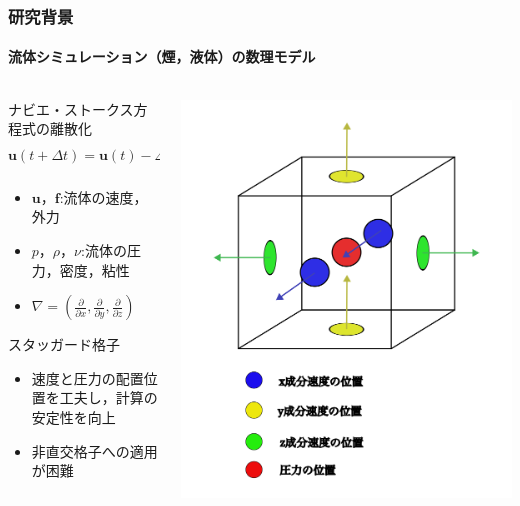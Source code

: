 \documentclass[aspectratio=169,dvipdfmx,hyperref={bookmarks=true}]{beamer}
\begin{document}
  \begin{frame}
  \frametitle{研究背景}
  \framesubtitle{流体シミュレーション（煙，液体）の数理モデル}

\begin{columns}[T]
	\begin{column}{0.6\linewidth}
	    \begin{block}{ナビエ・ストークス方程式の離散化}
    	\[
	\bm{u}(t + \varDelta t)  =\bm{u}(t) -\varDelta t( (\bm{u} \boldsymbol{\cdot}\nabla) \bm{u} - \frac{1}{\rho}\nabla p + \nu\nabla^2\bm{u} + \bm{f})
	\]
	\vspace{-10pt}
	\begin{itemize}
	\item $\bm{u}$，$\bm{f}$:流体の速度，外力
	\item $p$，$\rho$，$\nu$:流体の圧力，密度，粘性
	\item $\nabla = ( \frac{\partial}{\partial x}, \frac{\partial}{\partial y}, \frac{\partial}{\partial z})$
\end{itemize}
\end{block}
	\begin{block}{スタッガード格子}
		\begin{itemize}
		\item 速度と圧力の配置位置を工夫し，計算の安定性を向上
		\item 非直交格子への適用が困難
	\end{itemize}
	\end{block}
    	\end{column}
	\begin{column}{0.35\linewidth}
	\includegraphics[width=1.1\linewidth]{images/3dstaggerd.png}
	\label{fig:staggerd}
    	\end{column}
    \end{columns}
\end{frame}
\end{document}
